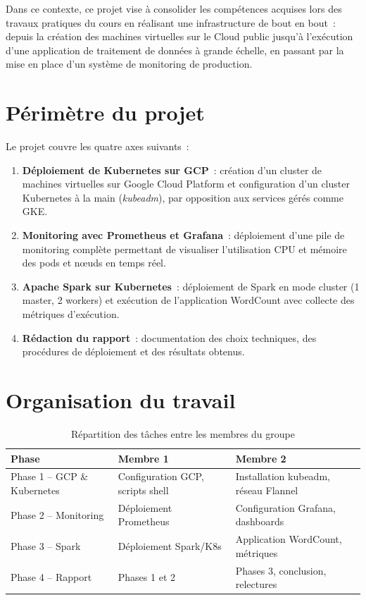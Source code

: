 \documentclass[12pt,a4paper,french]{report}
\begin{document}
Dans ce contexte, ce projet vise à consolider les compétences acquises lors des travaux pratiques du cours en réalisant une infrastructure de bout en bout~: depuis la création des machines virtuelles sur le Cloud public jusqu'à l'exécution d'une application de traitement de données à grande échelle, en passant par la mise en place d'un système de monitoring de production.

\section{Périmètre du projet}

Le projet couvre les quatre axes suivants~:

\begin{enumerate}[leftmargin=*]
  \item \textbf{Déploiement de Kubernetes sur GCP}~: création d'un cluster de machines virtuelles sur Google Cloud Platform et configuration d'un cluster Kubernetes à la main (\emph{kubeadm}), par opposition aux services gérés comme GKE.
  
  \item \textbf{Monitoring avec Prometheus et Grafana}~: déploiement d'une pile de monitoring complète permettant de visualiser l'utilisation CPU et mémoire des pods et nœuds en temps réel.
  
  \item \textbf{Apache Spark sur Kubernetes}~: déploiement de Spark en mode cluster (1 master, 2 workers) et exécution de l'application WordCount avec collecte des métriques d'exécution.
  
  \item \textbf{Rédaction du rapport}~: documentation des choix techniques, des procédures de déploiement et des résultats obtenus.
\end{enumerate}

\section{Organisation du travail}

\begin{table}[H]
\centering
\caption{Répartition des tâches entre les membres du groupe}
\label{tab:repartition}
\begin{tabularx}{\textwidth}{lXX}
\toprule
\textbf{Phase} & \textbf{Membre 1} & \textbf{Membre 2} \\
\midrule
Phase 1 – GCP \& Kubernetes & Configuration GCP, scripts shell & Installation kubeadm, réseau Flannel \\
\addlinespace
Phase 2 – Monitoring & Déploiement Prometheus & Configuration Grafana, dashboards \\
\addlinespace
Phase 3 – Spark & Déploiement Spark/K8s & Application WordCount, métriques \\
\addlinespace
Phase 4 – Rapport & Phases 1 et 2 & Phases 3, conclusion, relectures \\
\bottomrule
\end{tabularx}
\end{table}
\end{document}
